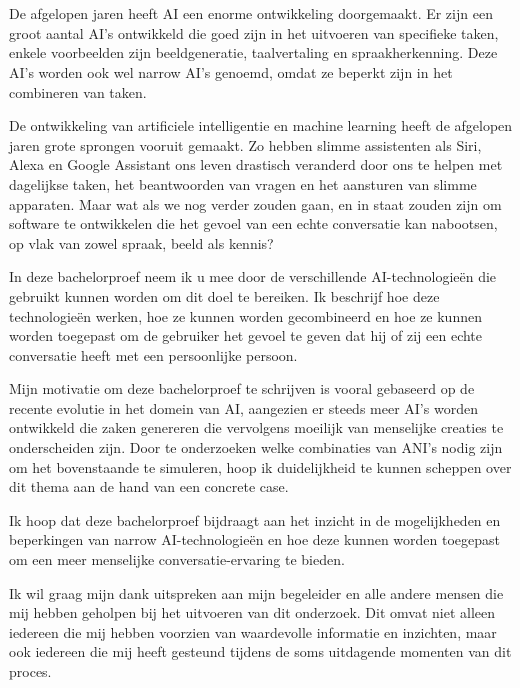 
\chapter*{}
\label{ch:voorwoord}


De afgelopen jaren heeft AI een enorme ontwikkeling doorgemaakt. Er zijn een groot aantal AI's ontwikkeld die goed zijn in het uitvoeren van specifieke taken, enkele voorbeelden zijn beeldgeneratie, taalvertaling en spraakherkenning. Deze AI's worden ook wel narrow AI's genoemd, omdat ze beperkt zijn in het combineren van taken.

De ontwikkeling van artificiele intelligentie en machine learning heeft de afgelopen jaren grote sprongen vooruit gemaakt. Zo hebben slimme assistenten als Siri, Alexa en Google Assistant ons leven drastisch veranderd door ons te helpen met dagelijkse taken, het beantwoorden van vragen en het aansturen van slimme apparaten. Maar wat als we nog verder zouden gaan, en in staat zouden zijn om software te ontwikkelen die het gevoel van een echte conversatie kan nabootsen, op vlak van zowel spraak, beeld als kennis?

In deze bachelorproef neem ik u mee door de verschillende AI-technologieën die gebruikt kunnen worden om dit doel te bereiken. Ik beschrijf hoe deze technologieën werken, hoe ze kunnen worden gecombineerd en hoe ze kunnen worden toegepast om de gebruiker het gevoel te geven dat hij of zij een echte conversatie heeft met een persoonlijke persoon.

Mijn motivatie om deze bachelorproef te schrijven is vooral gebaseerd op de recente evolutie in het domein van AI, aangezien er steeds meer AI's worden ontwikkeld die zaken genereren die vervolgens moeilijk van menselijke creaties te onderscheiden zijn. Door te onderzoeken welke combinaties van ANI's nodig zijn om het bovenstaande te simuleren, hoop ik duidelijkheid te kunnen scheppen over dit thema aan de hand van een concrete case.

Ik hoop dat deze bachelorproef bijdraagt aan het inzicht in de mogelijkheden en beperkingen van narrow AI-technologieën en hoe deze kunnen worden toegepast om een meer menselijke conversatie-ervaring te bieden.

Ik wil graag mijn dank uitspreken aan mijn begeleider en alle andere mensen die mij hebben geholpen bij het uitvoeren van dit onderzoek. Dit omvat niet alleen iedereen die mij hebben voorzien van waardevolle informatie en inzichten, maar ook iedereen die mij heeft gesteund tijdens de soms uitdagende momenten van dit proces.

